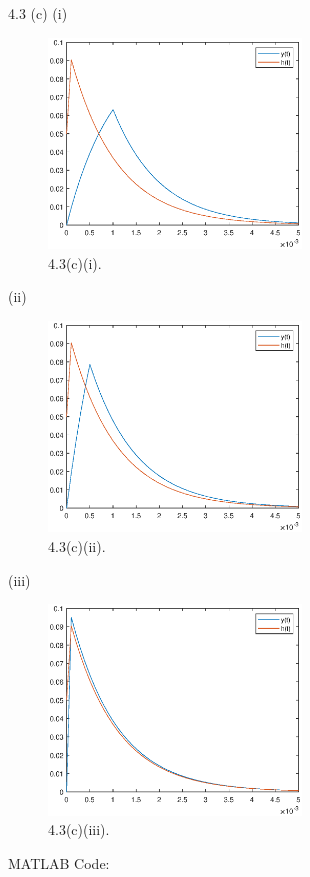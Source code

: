 \documentclass[a4paper]{article}
\begin{document}
4.3 (c) (i)
\begin{figure}[H]
    \begin{center}
        \includegraphics[width=0.6\textwidth]{4.3(c)(i).eps}
    \end{center}
    \caption{4.3(c)(i).}
\end{figure}
(ii)
\begin{figure}[H]
    \begin{center}
        \includegraphics[width=0.6\textwidth]{4.3(c)(ii).eps}
    \end{center}
    \caption{4.3(c)(ii).}
\end{figure}
(iii)
\begin{figure}[H]
    \begin{center}
        \includegraphics[width=0.6\textwidth]{4.3(c)(iii).eps}
    \end{center}
    \caption{4.3(c)(iii).}
\end{figure}
MATLAB Code:

\end{document}

